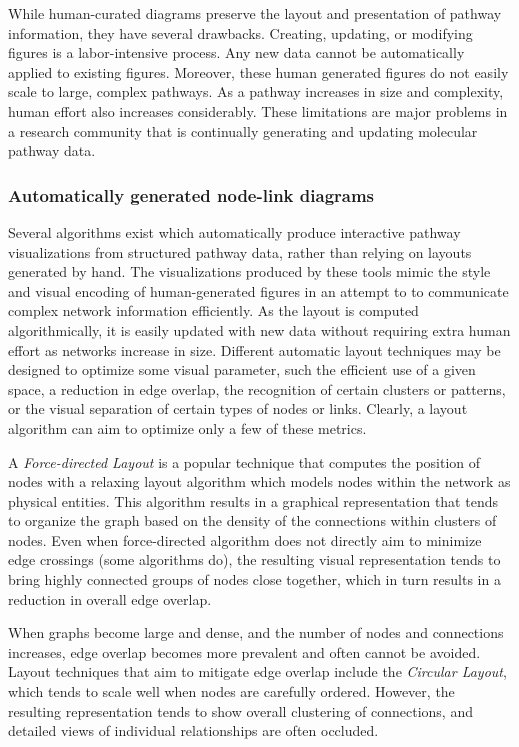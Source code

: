 \documentclass[review,journal]{vgtc}         %
\newcommand*{\p}[1]{\paragraph{\textbf{#1}}}
\begin{document}
While human-curated diagrams preserve the layout and presentation of pathway information, they have several drawbacks. Creating, updating, or modifying figures is a labor-intensive process. Any new data cannot be automatically applied to existing figures. Moreover, these human generated figures do not easily scale to large, complex pathways. As a pathway increases in size and complexity, human effort also increases considerably. These limitations are major problems in a research community that is continually generating and updating molecular pathway data.

\subsubsection{Automatically generated node-link diagrams}

Several algorithms exist which automatically produce interactive pathway visualizations from structured pathway data, rather than relying on layouts generated by hand. The visualizations produced by these tools mimic the style and visual encoding of human-generated figures in an attempt to to communicate complex network information efficiently. As the layout is computed algorithmically, it is easily updated with new data without requiring extra human effort as networks increase in size. Different automatic layout techniques may be designed to optimize some visual parameter, such the efficient use of a given space, a reduction in edge overlap, the recognition of certain clusters or patterns, or the visual separation of certain types of nodes or links. Clearly, a layout algorithm can aim to optimize only a few of these metrics.


A \textit{Force-directed Layout} is a popular technique that computes the position of nodes with a relaxing layout algorithm which models nodes within the network as physical entities. This algorithm results in a graphical representation that tends to organize the graph based on the density of the connections within clusters of nodes. Even when force-directed algorithm does not directly aim to minimize edge crossings (some algorithms do), the resulting visual representation tends to bring highly connected groups of nodes close together, which in turn results in a reduction in overall edge overlap.

When graphs become large and dense, and the number of nodes and connections increases, edge overlap becomes more prevalent and often cannot be avoided. Layout techniques that aim to mitigate edge overlap include the \emph{Circular Layout}, which tends to scale well when nodes are carefully ordered. However, the resulting representation tends to show overall clustering of connections, and detailed views of individual relationships are often occluded.
\end{document}

